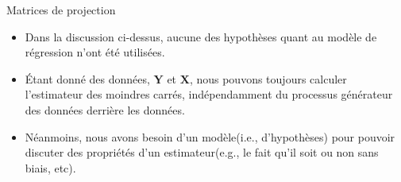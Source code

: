 \begin{frame}[allowframebreaks]{Matrices de projection}
\begin{itemize}
\begin{enumerate}
\begin{align*}
\end{align*}
 En effet,
\begin{align*}
\mathbf{P}_\mathbf{X}\mathbf{P}_\mathbf{X} &= \left(\mathbf{X}(\mathbf{X}^\top\mathbf{X})^{-1}\mathbf{X}^\top\right)\left(\mathbf{X}(\mathbf{X}^\top\mathbf{X})^{-1}\mathbf{X}^\top\right)\\ 
&= \mathbf{X}(\mathbf{X}^\top\mathbf{X})^{-1}\mathbf{X}^\top \\
&= \mathbf{P}_\mathbf{X}
\end{align*}
de même,
\begin{align*}
\mathbf{M}_\mathbf{X}\mathbf{M}_\mathbf{X} &= (\Id_n - \mathbf{P}_\mathbf{X})(\Id_n - \mathbf{P}_\mathbf{X})\\
& = \Id_n - 2\mathbf{P}_\mathbf{X} + \mathbf{P}_\mathbf{X}\mathbf{P}_\mathbf{X}\\
&=\Id_n - \mathbf{P}_\mathbf{X}\\
&=\mathbf{M}_\mathbf{X}
\end{align*}

\item $\mathbf{P}_\mathbf{X}$ et $\mathbf{M}_\mathbf{X}$ sont orthogonales,
\begin{align*}
\mathbf{P}_\mathbf{X}\mathbf{M}_\mathbf{X} &= \mathbf{P}_\mathbf{X}(\Id_n -  \mathbf{P}_\mathbf{X})\\
& =  \mathbf{P}_\mathbf{X} -  \mathbf{P}_\mathbf{X} \mathbf{P}_\mathbf{X}\\
&= \mathbf{P}_\mathbf{X}- \mathbf{P}_\mathbf{X}\\
&=0
\end{align*}
Cette propriété implique que $\mathbf{M}_\mathbf{X}\mathbf{X} = 0$. En effet,
\begin{align*}
\mathbf{M}_\mathbf{X}\mathbf{X} &= (\Id_n - \mathbf{P}_\mathbf{X})\mathbf{X}\\ 
&= \mathbf{X}-\mathbf{P}_\mathbf{X}\mathbf{X}\\
& = \mathbf{X} - \mathbf{X}\\
& = 0
\end{align*}
\end{enumerate}
\item Dans la discussion ci-dessus, aucune des hypothèses quant au
  modèle de régression n'ont été utilisées. 
\item \'Etant donné des données, $\mathbf{Y}$ et $\mathbf{X}$, nous
  pouvons toujours calculer l'estimateur des moindres carrés,
  indépendamment du processus générateur des données derrière les
  données. 
\item Néanmoins, nous avons besoin d'un modèle(i.e., d'hypothèses) pour pouvoir discuter des propriétés d'un estimateur(e.g., le fait qu'il soit ou non sans biais, etc).
\end{itemize}
\end{frame}

